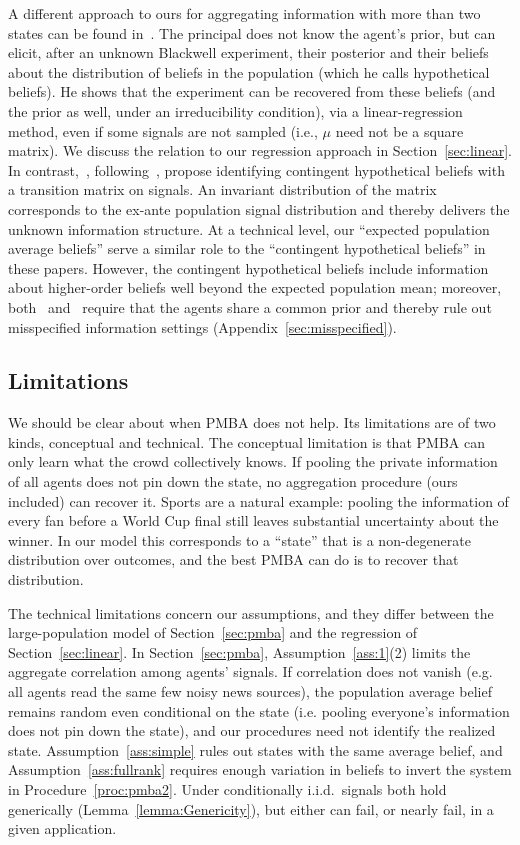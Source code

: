 \documentclass[12pt,reqno]{amsart}
\begin{document}
A different approach to ours for aggregating information with more than two states can be found in~\cite{libgober2025wisdom}. The principal does not know the agent's prior, but can elicit, after an unknown Blackwell experiment, their posterior and  their beliefs about the distribution of beliefs in the population (which he calls hypothetical beliefs).  He shows that the experiment can be recovered from these beliefs (and the prior as well, under an irreducibility condition), via a linear-regression method, even if some signals are not sampled (i.e., $\mu$ need not be a square matrix). We discuss the relation to our regression approach in Section~\ref{sec:linear}. In contrast,~\cite{prelec2022general}, following~\cite{samet1998iterated}, propose identifying contingent hypothetical beliefs with a transition matrix on signals. An invariant distribution of the matrix corresponds to the ex-ante population signal distribution and thereby delivers the unknown information structure. At a technical level, our ``expected population average beliefs'' serve a similar role to the ``contingent hypothetical beliefs'' in these papers. However, the contingent hypothetical beliefs include information about higher-order beliefs well beyond the expected population mean; moreover, both~\cite{libgober2025wisdom} and~\cite{prelec2022general} require that the agents share a common prior and thereby rule out misspecified information settings (Appendix~\ref{sec:misspecified}).

\subsection{\texorpdfstring{Limitations}{Limitations}}\label{sec:limitations}
We should be clear about when PMBA does not help. Its limitations are of two kinds, conceptual and technical. The conceptual limitation is that PMBA can only learn what the crowd collectively knows. If pooling the private information of all agents does not pin down the state, no aggregation procedure (ours included) can recover it. Sports are a natural example: pooling the information of every fan before a World Cup final still leaves substantial uncertainty about the winner. In our model this corresponds to a ``state'' that is a non-degenerate distribution over outcomes, and the best PMBA can do is to recover that distribution.

The technical limitations concern our assumptions, and they differ between the large-population model of Section~\ref{sec:pmba} and the regression of Section~\ref{sec:linear}. In Section~\ref{sec:pmba}, Assumption~\ref{ass:1}(2) limits the aggregate correlation among agents' signals. If correlation does not vanish (e.g. all agents read the same few noisy news sources), the population average belief remains random even conditional on the state (i.e. pooling everyone's information does not pin down the state), and our procedures need not identify the realized state. Assumption~\ref{ass:simple} rules out states with the same average belief, and Assumption~\ref{ass:fullrank} requires enough variation in beliefs to invert the system in Procedure~\ref{proc:pmba2}. Under conditionally i.i.d.\ signals both hold generically (Lemma~\ref{lemma:Genericity}), but either can fail, or nearly fail, in a given application.
\end{document}
